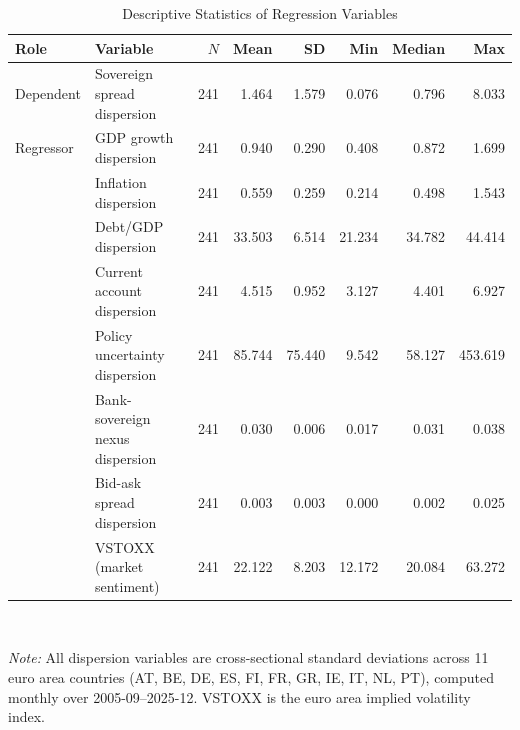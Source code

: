 \begin{table}[htbp]
  \centering
  \caption{Descriptive Statistics of Regression Variables}
  \label{tab:descriptive_stats}
  \fontsize{8}{9.5}\selectfont
  \begin{tabular}{llrrrrrr}
    \toprule
    Role & Variable & $N$ & Mean & SD & Min & Median & Max \\
    \midrule
    Dependent & Sovereign spread dispersion & 241 & 1.464 & 1.579 & 0.076 & 0.796 & 8.033 \\
    \midrule
    Regressor & GDP growth dispersion & 241 & 0.940 & 0.290 & 0.408 & 0.872 & 1.699 \\
     & Inflation dispersion & 241 & 0.559 & 0.259 & 0.214 & 0.498 & 1.543 \\
     & Debt/GDP dispersion & 241 & 33.503 & 6.514 & 21.234 & 34.782 & 44.414 \\
     & Current account dispersion & 241 & 4.515 & 0.952 & 3.127 & 4.401 & 6.927 \\
     & Policy uncertainty dispersion & 241 & 85.744 & 75.440 & 9.542 & 58.127 & 453.619 \\
     & Bank-sovereign nexus dispersion & 241 & 0.030 & 0.006 & 0.017 & 0.031 & 0.038 \\
     & Bid-ask spread dispersion & 241 & 0.003 & 0.003 & 0.000 & 0.002 & 0.025 \\
     & VSTOXX (market sentiment) & 241 & 22.122 & 8.203 & 12.172 & 20.084 & 63.272 \\
    \bottomrule
  \end{tabular}
  \\[4pt]
  \raggedright\footnotesize
  \textit{Note:} All dispersion variables are cross-sectional standard deviations
  across 11 euro area countries (AT, BE, DE, ES, FI, FR, GR, IE, IT, NL, PT),
  computed monthly over 2005-09–2025-12.
  VSTOXX is the euro area implied volatility index.
\end{table}
